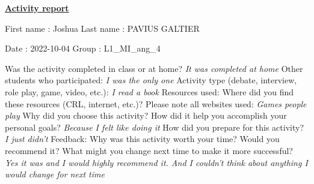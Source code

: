 \documentclass[]{article}
\begin{document}
  \begin{center}
    \underline{\textbf{Activity report}}
  \end{center}
  \vspace*{20 pt}

First name : Joshua
  \hspace*{120pt}
Last name : PAVIUS GALTIER
  \newline

Date : 2022-10-04
  \hspace*{170pt}
Group : L1\_MI\_ang\_4
  \newline

  Was the activity completed in class or at home? \newline
\indent\emph{It was completed at home}
  \newline
  \indent Other students who participated: \newline
\indent\emph{I was the only one}
  \newline\newline\newline\newline
  Activity type (debate, interview, role play, game, video, etc.):
\indent\emph{I read a book}
  \newline\newline\newline\newline
  Resources used: Where did you find these resources (CRL, internet, etc.)? Please note all websites used: 
\indent\emph{Games people play}
  \newline\newline\newline\newline
  Why did you choose this activity? How did it help you accomplish your personal goals?
\indent\emph{Because I felt like doing it}
  \newline\newline\newline\newline
  How did you prepare for this activity? 
\indent\emph{I just didn't}
  \newline\newline\newline\newline
  Feedback: Why was this activity worth your time? Would you recommend it? What might you change next time to make it more successful? 
  \newline\newline
\indent\emph{Yes it was and I would highly recommend it. And I couldn't think about anything I would change for next time}
\end{document}
